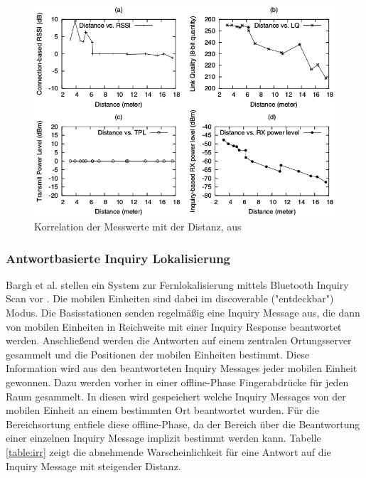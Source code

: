 \begin{figure}[h]
  \centering
	\includegraphics[width=\textwidth]{images/bluetoothmess.png}
  \caption{Korrelation der Messwerte mit der Distanz, aus \cite{hossain2007comprehensive}}
  \label{fig:bluetoothmess}
\end{figure}

\subsubsection{Antwortbasierte Inquiry Lokalisierung}
Bargh et al. stellen ein System zur Fernlokalisierung mittels Bluetooth Inquiry Scan vor \cite{bargh2008indoor}.
Die mobilen Einheiten sind dabei im discoverable ("{}entdeckbar"{}) Modus.
Die Basisstationen senden regelmäßig eine Inquiry Message aus, die dann von mobilen Einheiten in Reichweite mit einer Inquiry Response beantwortet werden. 
Anschließend werden die Antworten auf einem zentralen Ortungsserver gesammelt und die Positionen der mobilen Einheiten bestimmt.
Diese Information wird aus den beantworteten Inquiry Messages jeder mobilen Einheit gewonnen.
Dazu werden vorher in einer offline-Phase Fingerabdrücke für jeden Raum gesammelt.
In diesen wird gespeichert welche Inquiry Messages von der mobilen Einheit an einem bestimmten Ort beantwortet wurden.
Für die Bereichsortung entfiele diese offline-Phase, da der Bereich über die Beantwortung einer einzelnen Inquiry Message implizit bestimmt werden kann.
Tabelle \ref{table:irr} zeigt die abnehmende Warscheinlichkeit für eine Antwort auf die Inquiry Message mit steigender Distanz.

